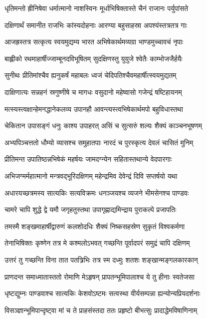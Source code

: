 \twolineshloka
{धृतिमन्तो ह्रीनिषेवा धर्मात्मानो नाशस्विनः}
{मूर्धाभिषिक्तास्ते चैनं राजानः पर्युपांसते}


\twolineshloka
{दक्षिणार्थं समानीत राजभिः कांस्यदोहनाः}
{आरण्या बहुसाहस्रा अपश्यंस्तत्रतत्र गाः}


\twolineshloka
{आजह्रस्तत्र सत्कृत्य स्वयमुद्यम्य भारत}
{अभिषेकार्थमव्यग्रा भाण्डमुच्चावचं नृपाः}


\twolineshloka
{बाह्लीको रथमाहार्षीज्जाम्बूनदविभूषितम्}
{सुदक्षिणस्तु युयुजे श्वेतैः काम्भोजजैर्हयैः}


\twolineshloka
{सुनीथः प्रीतिमांश्चैव ह्यनुकर्षं महाबलः}
{ध्वजं चेदिपतिश्चैवमहार्षीत्स्वयमुद्यतम्}


\twolineshloka
{दाक्षिणात्यः सन्नहनं स्रगुष्णीषे च मागधः}
{वसुदानो महेष्वासो गजेन्द्रं षष्टिहायनम्}


\twolineshloka
{मत्स्यस्त्वक्षान्हेमनद्धानेकलव्य उपानहौ}
{आवन्त्यस्त्वभिषेकार्थमपो बहुविधास्तथा}


\twolineshloka
{चेकितान उपासङ्गं धनुः काश्य उपाहरत्}
{असिं च सुत्सरुं शल्यः शैक्यं काञ्चनभूषणम्}


\twolineshloka
{अभ्यपिञ्चत्ततो धौम्यो व्यासश्च समुहातपाः}
{नारदं च पुरस्कृत्य देवलं चासितं मुनिम्}


\twolineshloka
{प्रीतिमन्त उपातिष्ठन्नभिषेकं महर्षयः}
{जामदग्न्येन सहितास्तथान्ये वेदपारगाः}


\twolineshloka
{अभिजग्मर्महात्मानो मन्त्रवद्भूरिदक्षिणम्}
{महेन्द्रमिव देवेन्द्रं दिवि सप्तर्षयो यथा}


\twolineshloka
{अधारयच्छत्रमस्य सात्यकिः सत्यविक्रमः}
{धनञ्जयश्च व्यजने भीमसेनश्च पाण्डवः}


\twolineshloka
{चामरे चापि शुद्धे द्वे यमौ जगृहतुस्तथा}
{उपागृह्णाद्यमिन्द्राय पुराकल्पे प्रजापतिः}


\twolineshloka
{तमस्मै शङ्खमाहार्षीद्वारुणं कलशोदधिः}
{शैक्यं निष्कसहस्रेण सुकृतं विश्वकर्मणा}


\twolineshloka
{तेनाभिषिक्तः कृष्णेन तत्र मे कश्मलोऽभवत्}
{गच्छन्ति पूर्वादपरं समुद्रं चापि दक्षिणम्}


\twolineshloka
{उत्तरं तु गच्छन्ति विना तात पतत्र्रिभिः}
{तत्र स्म दध्मुः शतशः शङ्खान्मङ्गलकारकान्}


\twolineshloka
{प्राणदन्त समाध्मातास्ततो रोमाणि मेऽहृषन्}
{प्रापतन्भूमिपालाश्च ये तु हीनाः स्वतेजसा}


\twolineshloka
{धृष्टद्युम्नः पाण्डवाश्च सात्यकिः केशवोऽष्टमः}
{सत्वस्था वीर्यसम्पन्ना ह्यन्योन्यप्रियदर्शनाः}


\twolineshloka
{विसञ्ज्ञान्भूमिपान्दृष्ट्वा मां च ते प्राहसंस्तदा}
{ततः प्रहृष्टो बीभत्सुः प्रादाद्धेमविषाणिनाम्}


